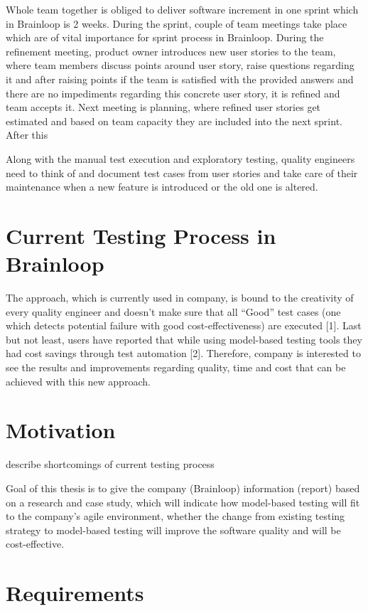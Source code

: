Whole team together is obliged to deliver software increment in one sprint which in Brainloop is 2 weeks. During the sprint, couple of team meetings take place which are of vital importance for sprint process in Brainloop. During the refinement meeting, product owner introduces new user stories to the team, where team members discuss points around user story, raise questions regarding it and after raising points if the team is satisfied with the provided answers and there are no impediments regarding this concrete user story, it is refined and team accepts it. Next meeting is planning, where refined user stories get estimated and based on team capacity they are included into the next sprint. After this  


Along with the manual test execution and exploratory testing, quality engineers need to think of and document test cases from user stories and take care of their maintenance when a new feature is introduced or the old one is altered. 

\section{Current Testing Process in Brainloop}

The approach, which is currently used in company, is bound to the creativity of every quality engineer and doesn’t make sure that all “Good” test cases (one which detects potential failure with good cost-effectiveness) are executed [1]. Last but not least, users have reported that while using model-based testing tools they had cost savings through test automation [2]. Therefore, company is interested to see the results and improvements regarding quality, time and cost that can be achieved with this new approach.

\section{Motivation}

describe shortcomings of current testing process

Goal of this thesis is to give the company (Brainloop) information (report) based on a research and case study, which will indicate how model-based testing will fit to the company’s agile environment, whether the change from existing testing strategy to model-based testing will improve the software quality and will be cost-effective.

\section{Requirements}

